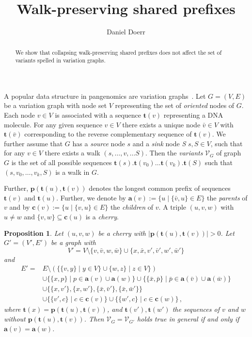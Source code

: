 \documentclass[a4paper]{article}
\title{Walk-preserving shared prefixes}
\author{Daniel Doerr}
\newtheorem{proposition}{Proposition}
\newcommand{\prefix}{\mathbf{p}}
\newcommand{\parent}{\mathbf{a}}
\newcommand{\child}{\mathbf{c}}
\newcommand{\seq}{\mathbf{t}}
\begin{document}
\maketitle

\begin{abstract}
    We show that collapsing walk-preserving shared prefixes does not affect the set of variants spelled in variation graphs.
\end{abstract} 

A popular data structure in pangenomics are variation graphs~\cite{hprc,mc,odgi}. 
Let $G = (V, E)$ be a variation graph with node set $V$ representing the set of
\emph{oriented} nodes of $G$. Each node $v \in V$ is associated with a sequence
$\seq(v)$ representing a DNA molecule. For any given sequence $v \in V$ there exists
a unique node $\bar v \in V$ with $\seq(\bar v)$ corresponding to the 
reverse complementary sequence of $\seq(v)$. We further assume that $G$  has a
\emph{source} node $s$ and a \emph{sink} node \emph{S} $s, S \in V$, such that
for any $v \in V$ there exists a walk $(s,\ldots, v, \ldots S)$. Then the
\emph{variants} $\mathcal V_G$ of graph $G$ is the set of all possible sequences
$\seq(s).\seq(v_0)\ldots\seq(v_k).\seq(S)$ such that $(s, v_0, \ldots, v_k, S )$ is
a walk in $G$. 

Further, $\prefix(\seq(u), \seq(v))$ denotes the longest common prefix of
sequences $\seq(v)$ and $\seq(u)$. Further, we denote by $\parent(v) := \{u
\mid \{\bar v, u\} \in E\}$ the \emph{parents} of $v$ and by $\child(v) := \{u
\mid \{v, u\} \in E\}$ the \emph{children} of $v$. A triple $(u, v, w)$ with $u
\neq w$ and $\{v, w\} \subseteq\child(u)$ is a \emph{cherry}. 

\begin{proposition}
    Let $(u, v, w)$ be a cherry with $|\prefix(\seq(u), \seq(v))| > 0$. Let $G' =
    (V', E')$ be a graph with 
    \[
        V' = V \setminus \{v, \bar v, w, \bar w\} \cup \{x, \bar x, v', \bar
        v', w', \bar w'\}
    \]
    and 
    \begin{align*}
        E' = & E \setminus (\{\{v, y\} \mid y \in V\} \cup \{w, z\} \mid z \in
        V\}) \\
        & \cup \{\{x, p\} \mid p \in \parent(v) \cup \parent(w)\} \cup
        \{\{\bar x, \bar p \} \mid \bar p \in \parent(\bar v) \cup \parent(\bar
        w) \} \\
        & \cup \{\{x, v'\}, \{x, w'\}, \{\bar x, \bar v'\}, \{\bar x, \bar
        w'\}\} \\
        & \cup \{\{v', c\} \mid c \in \child(v) \} \cup \{\{w', c\} \mid c \in
        \child(w)\}\,,
    \end{align*}
    where $\seq(x) = \prefix(\seq(u), \seq(v))$, and $\seq(v'), \seq(w')$ the
    sequences of $v$ and $w$ without $\prefix(\seq(u), \seq(v))$. 
    Then $\mathcal V_G = \mathcal V_{G'}$ holds true in general if and only if
    $\parent(v) = \parent(w)$.
\end{proposition}
\end{document}
